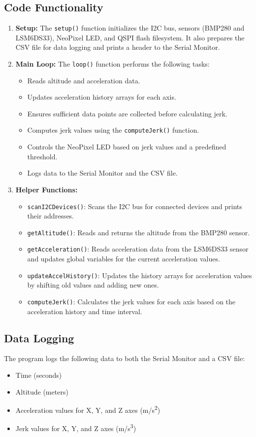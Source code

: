 \documentclass{article}
\begin{document}
\subsection{Code Functionality}
\begin{enumerate}
    \item \textbf{Setup:} The \texttt{setup()} function initializes the I2C bus, sensors (BMP280 and LSM6DS33), NeoPixel LED, and QSPI flash filesystem. It also prepares the CSV file for data logging and prints a header to the Serial Monitor.
    \item \textbf{Main Loop:} The \texttt{loop()} function performs the following tasks:
    \begin{itemize}
        \item Reads altitude and acceleration data.
        \item Updates acceleration history arrays for each axis.
        \item Ensures sufficient data points are collected before calculating jerk.
        \item Computes jerk values using the \texttt{computeJerk()} function.
        \item Controls the NeoPixel LED based on jerk values and a predefined threshold.
        \item Logs data to the Serial Monitor and the CSV file.
    \end{itemize}
    \item \textbf{Helper Functions:}
    \begin{itemize}
        \item \texttt{scanI2CDevices()}: Scans the I2C bus for connected devices and prints their addresses.
        \item \texttt{getAltitude()}: Reads and returns the altitude from the BMP280 sensor.
        \item \texttt{getAcceleration()}: Reads acceleration data from the LSM6DS33 sensor and updates global variables for the current acceleration values.
        \item \texttt{updateAccelHistory()}: Updates the history arrays for acceleration values by shifting old values and adding new ones.
        \item \texttt{computeJerk()}: Calculates the jerk values for each axis based on the acceleration history and time interval.
    \end{itemize}
\end{enumerate}

\subsection{Data Logging}
The program logs the following data to both the Serial Monitor and a CSV file:
\begin{itemize}
    \item Time (seconds)
    \item Altitude (meters)
    \item Acceleration values for X, Y, and Z axes (m/s\textsuperscript{2})
    \item Jerk values for X, Y, and Z axes (m/s\textsuperscript{3})
\end{itemize}
\end{document}
